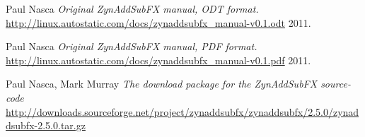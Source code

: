 \begin{thebibliography}{99}
   Paul Nasca
   \emph{Original ZynAddSubFX manual, ODT format.}
   \url{http://linux.autostatic.com/docs/zynaddsubfx\_manual-v0.1.odt}
   2011.

   Paul Nasca
   \emph{Original ZynAddSubFX manual, PDF format.}
   \url{http://linux.autostatic.com/docs/zynaddsubfx\_manual-v0.1.pdf}
   2011.

   Paul Nasca, Mark Murray
   \emph{The download package for the ZynAddSubFX source-code}
   \url{http://downloads.sourceforge.net/project/zynaddsubfx/zynaddsubfx/2.5.0/zynaddsubfx-2.5.0.tar.gz}

\end{thebibliography}

